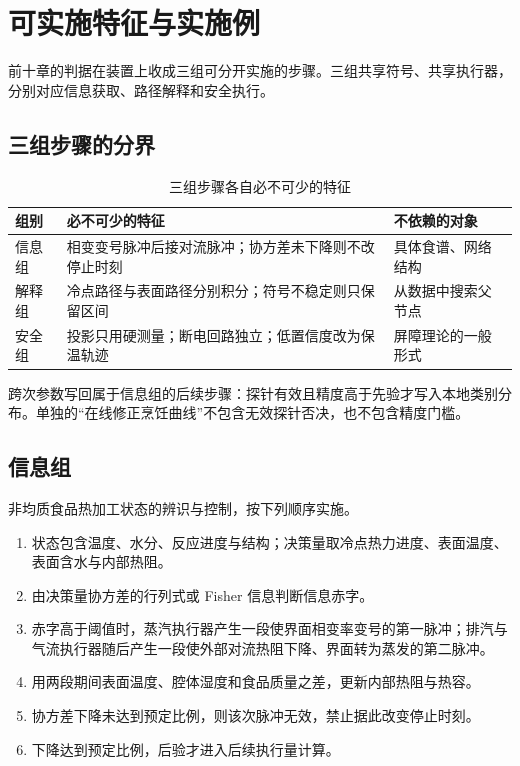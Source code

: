 \chapter{可实施特征与实施例}
\label{ch:patent}

前十章的判据在装置上收成三组可分开实施的步骤。三组共享符号、共享执行器，分别对应信息获取、路径解释和安全执行。

\section{三组步骤的分界}

\begin{table}[H]
\centering
\caption{三组步骤各自必不可少的特征}
\begin{tabularx}{\textwidth}{lXX}
\toprule
组别 & 必不可少的特征 & 不依赖的对象 \\
\midrule
信息组 & 相变变号脉冲后接对流脉冲；协方差未下降则不改停止时刻 & 具体食谱、网络结构 \\
解释组 & 冷点路径与表面路径分别积分；符号不稳定则只保留区间 & 从数据中搜索父节点 \\
安全组 & 投影只用硬测量；断电回路独立；低置信度改为保温轨迹 & 屏障理论的一般形式 \\
\bottomrule
\end{tabularx}
\end{table}

跨次参数写回属于信息组的后续步骤：探针有效且精度高于先验才写入本地类别分布。单独的“在线修正烹饪曲线”不包含无效探针否决，也不包含精度门槛。

\section{信息组}

非均质食品热加工状态的辨识与控制，按下列顺序实施。

\begin{enumerate}
\item 状态包含温度、水分、反应进度与结构；决策量取冷点热力进度、表面温度、表面含水与内部热阻。
\item 由决策量协方差的行列式或 Fisher 信息判断信息赤字。
\item 赤字高于阈值时，蒸汽执行器产生一段使界面相变率变号的第一脉冲；排汽与气流执行器随后产生一段使外部对流热阻下降、界面转为蒸发的第二脉冲。
\item 用两段期间表面温度、腔体湿度和食品质量之差，更新内部热阻与热容。
\item 协方差下降未达到预定比例，则该次脉冲无效，禁止据此改变停止时刻。
\item 下降达到预定比例，后验才进入后续执行量计算。
\end{enumerate}

